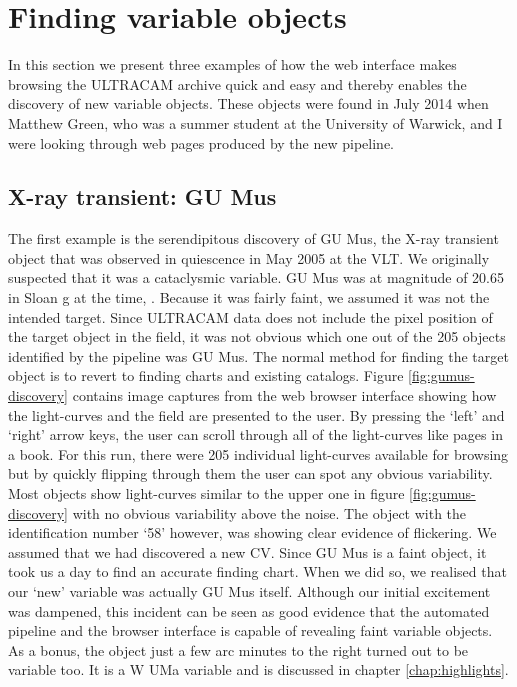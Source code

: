\section{Finding variable objects}
In this section we present three examples of how the web interface makes browsing the ULTRACAM archive quick and easy and thereby enables the discovery of new variable objects. These objects were found in July 2014 when Matthew Green, who was a summer student at the University of Warwick, and I were looking through web pages produced by the new pipeline.

\subsection{X-ray transient: GU Mus}
The first example is the serendipitous discovery of {GU Mus}, the X-ray transient object that was observed in quiescence in May 2005 at the VLT. We originally suspected that it was a cataclysmic variable. {GU Mus} was at magnitude of 20.65 in Sloan g at the time, \citep{tariq2010}. Because it was fairly faint, we assumed it was not the intended target. Since ULTRACAM data does not include the pixel position of the target object in the field, it was not obvious which one out of the 205 objects identified by the pipeline was {GU Mus}. The normal method for finding the target object is to revert to finding charts and existing catalogs. Figure \ref{fig:gumus-discovery} contains image captures from the web browser interface showing how the light-curves and the field are presented to the user. By pressing the `left' and `right' arrow keys, the user can scroll through all of the light-curves like pages in a book. For this run, there were 205 individual light-curves available for browsing but by quickly flipping through them the user can spot any obvious variability. Most objects show light-curves similar to the upper one in figure \ref{fig:gumus-discovery} with no obvious variability above the noise. The object with the identification number `58' however, was showing clear evidence of flickering. We assumed that we had discovered a new CV. Since {GU Mus} is a faint object, it took us a day to find an accurate finding chart. When we did so, we realised that our `new' variable was actually {GU Mus} itself. Although our initial excitement was dampened, this incident can be seen as good evidence that the automated pipeline and the browser interface is capable of revealing faint variable objects. As a bonus, the object just a few arc minutes to the right turned out to be variable too. It is a {W UMa} variable and is discussed in chapter \ref{chap:highlights}.

